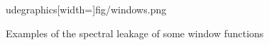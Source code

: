 \documentclass[10pt,twocolumn]{article}
\begin{document}
\begin{figure}[H]
udegraphics[width=\linewidth]{fig/windows.png}
    \caption{Examples of the spectral leakage of some window functions}
    \label{fig:windowfunceffect}
\end{figure}
\end{document}
